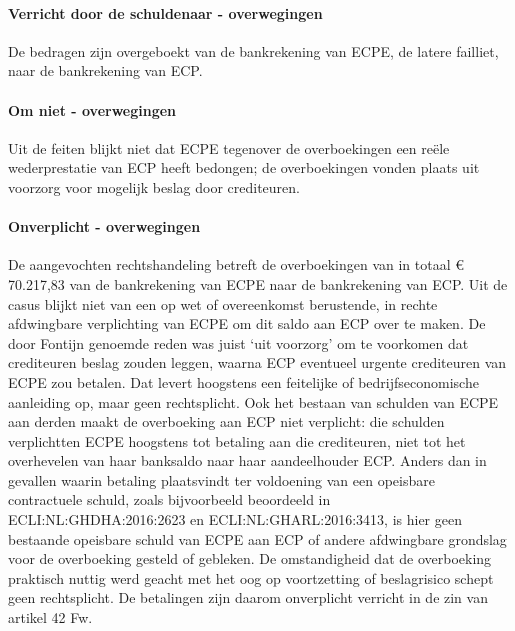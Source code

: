 \documentclass[
  dutch,
  a4paper,
]{article}
\begin{document}
\paragraph{Verricht door de schuldenaar - overwegingen}\label{verricht-door-de-schuldenaar---overwegingen-49}

De bedragen zijn overgeboekt van de bankrekening van ECPE, de latere failliet, naar de bankrekening van ECP.

\paragraph{Om niet - overwegingen}\label{om-niet---overwegingen-49}

Uit de feiten blijkt niet dat ECPE tegenover de overboekingen een reële wederprestatie van ECP heeft bedongen; de overboekingen vonden plaats uit voorzorg voor mogelijk beslag door crediteuren.

\paragraph{Onverplicht - overwegingen}\label{onverplicht---overwegingen-49}

De aangevochten rechtshandeling betreft de overboekingen van in totaal € 70.217,83 van de bankrekening van ECPE naar de bankrekening van ECP. Uit de casus blijkt niet van een op wet of overeenkomst berustende, in rechte afdwingbare verplichting van ECPE om dit saldo aan ECP over te maken. De door Fontijn genoemde reden was juist `uit voorzorg' om te voorkomen dat crediteuren beslag zouden leggen, waarna ECP eventueel urgente crediteuren van ECPE zou betalen. Dat levert hoogstens een feitelijke of bedrijfseconomische aanleiding op, maar geen rechtsplicht. Ook het bestaan van schulden van ECPE aan derden maakt de overboeking aan ECP niet verplicht: die schulden verplichtten ECPE hoogstens tot betaling aan die crediteuren, niet tot het overhevelen van haar banksaldo naar haar aandeelhouder ECP. Anders dan in gevallen waarin betaling plaatsvindt ter voldoening van een opeisbare contractuele schuld, zoals bijvoorbeeld beoordeeld in ECLI:NL:GHDHA:2016:2623 en ECLI:NL:GHARL:2016:3413, is hier geen bestaande opeisbare schuld van ECPE aan ECP of andere afdwingbare grondslag voor de overboeking gesteld of gebleken. De omstandigheid dat de overboeking praktisch nuttig werd geacht met het oog op voortzetting of beslagrisico schept geen rechtsplicht. De betalingen zijn daarom onverplicht verricht in de zin van artikel 42 Fw.
\end{document}
